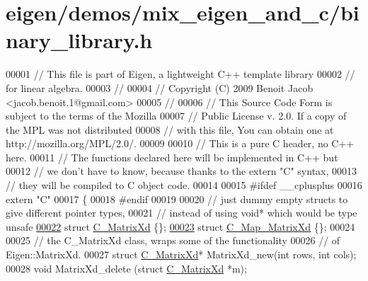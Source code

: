 \hypertarget{eigen_2demos_2mix__eigen__and__c_2binary__library_8h_source}{}\section{eigen/demos/mix\+\_\+eigen\+\_\+and\+\_\+c/binary\+\_\+library.h}
\label{eigen_2demos_2mix__eigen__and__c_2binary__library_8h_source}

\begin{DoxyCode}
00001 \textcolor{comment}{// This file is part of Eigen, a lightweight C++ template library}
00002 \textcolor{comment}{// for linear algebra.}
00003 \textcolor{comment}{//}
00004 \textcolor{comment}{// Copyright (C) 2009 Benoit Jacob <jacob.benoit.1@gmail.com>}
00005 \textcolor{comment}{//}
00006 \textcolor{comment}{// This Source Code Form is subject to the terms of the Mozilla}
00007 \textcolor{comment}{// Public License v. 2.0. If a copy of the MPL was not distributed}
00008 \textcolor{comment}{// with this file, You can obtain one at http://mozilla.org/MPL/2.0/.}
00009 
00010 \textcolor{comment}{// This is a pure C header, no C++ here.}
00011 \textcolor{comment}{// The functions declared here will be implemented in C++ but}
00012 \textcolor{comment}{// we don't have to know, because thanks to the extern "C" syntax,}
00013 \textcolor{comment}{// they will be compiled to C object code.}
00014 
00015 \textcolor{preprocessor}{#ifdef \_\_cplusplus}
00016 \textcolor{keyword}{extern} \textcolor{stringliteral}{"C"}
00017 \{
00018 \textcolor{preprocessor}{#endif}
00019 
00020   \textcolor{comment}{// just dummy empty structs to give different pointer types,}
00021   \textcolor{comment}{// instead of using void* which would be type unsafe}
\hyperlink{struct_c___matrix_xd}{00022}   \textcolor{keyword}{struct }\hyperlink{struct_c___matrix_xd}{C\_MatrixXd} \{\};
\hyperlink{struct_c___map___matrix_xd}{00023}   \textcolor{keyword}{struct }\hyperlink{struct_c___map___matrix_xd}{C\_Map\_MatrixXd} \{\};
00024 
00025   \textcolor{comment}{// the C\_MatrixXd class, wraps some of the functionality}
00026   \textcolor{comment}{// of Eigen::MatrixXd.}
00027   \textcolor{keyword}{struct }\hyperlink{struct_c___matrix_xd}{C\_MatrixXd}* MatrixXd\_new(\textcolor{keywordtype}{int} rows, \textcolor{keywordtype}{int} cols);
00028   \textcolor{keywordtype}{void}    MatrixXd\_delete     (\textcolor{keyword}{struct} \hyperlink{struct_c___matrix_xd}{C\_MatrixXd} *m);

\end{DoxyCode}
